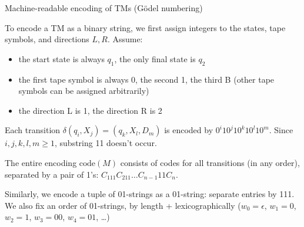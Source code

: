 \documentclass[handout]{beamer}
\begin{document}
\begin{frame}{Machine-readable encoding of TMs (Gödel numbering)}

    \vspace{-5pt}
    To encode a TM as a binary string, we first assign integers to the states, tape symbols, and directions $L,R$. Assume:
    \begin{itemize}
        \item the start state is always $q_1$, the only final state is $q_2$
        \item the first tape symbol is always 0, the second 1, the third B (other tape symbols can be assigned arbitrarily)
        \item the direction L is 1, the direction R is 2
    \end{itemize}
    Each transition $\delta(q_i,X_j)=(q_k,X_l,D_m)$ is encoded by $0^i10^j10^k10^l10^m$. Since $i,j,k,l,m\geq 1$, substring 11 doesn't occur.
    
    The entire encoding \alert{$\mathrm{code}(M)$} consists of codes for all transitions (in any order), separated by a pair of 1's: $C_111C_211\ldots C_{n-1}11C_n$.

    Similarly, we encode a tuple of 01-strings as a 01-string: separate entries by 111. We also fix an order of 01-strings, by length + lexicographically ($w_0=\epsilon$, $w_1=0$, $w_2=1$, $w_3=00$, $w_4=01$, \dots)

\end{frame}
\end{document}
